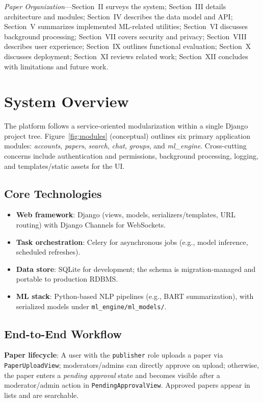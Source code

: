 \documentclass[conference]{IEEEtran}
\begin{document}
\noindent\textit{Paper Organization}---Section~II surveys the system; Section~III details architecture and modules; Section~IV describes the data model and API; Section~V summarizes implemented ML-related utilities; Section~VI discusses background processing; Section~VII covers security and privacy; Section~VIII describes user experience; Section~IX outlines functional evaluation; Section~X discusses deployment; Section~XI reviews related work; Section~XII concludes with limitations and future work.

\section{System Overview}
The platform follows a service-oriented modularization within a single Django project tree. Figure~\ref{fig:modules} (conceptual) outlines six primary application modules: \emph{accounts}, \emph{papers}, \emph{search}, \emph{chat}, \emph{groups}, and \emph{ml\_engine}. Cross-cutting concerns include authentication and permissions, background processing, logging, and templates/static assets for the UI.

\subsection{Core Technologies}
\begin{itemize}
  \item \textbf{Web framework}: Django (views, models, serializers/templates, URL routing) with Django Channels for WebSockets.
  \item \textbf{Task orchestration}: Celery for asynchronous jobs (e.g., model inference, scheduled refreshes).
  \item \textbf{Data store}: SQLite for development; the schema is migration-managed and portable to production RDBMS.
  \item \textbf{ML stack}: Python-based NLP pipelines (e.g., BART summarization), with serialized models under \texttt{ml\_engine/ml\_models/}.
\end{itemize}

\subsection{End-to-End Workflow}
\textbf{Paper lifecycle}: A user with the \texttt{publisher} role uploads a paper via \texttt{PaperUploadView}; moderators/admins can directly approve on upload; otherwise, the paper enters a \textit{pending approval} state and becomes visible after a moderator/admin action in \texttt{PendingApprovalView}. Approved papers appear in lists and are searchable.
\end{document}

